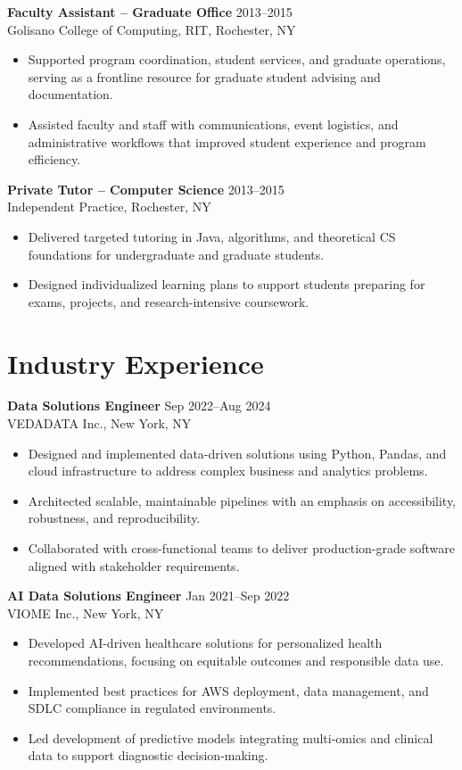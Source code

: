 \documentclass[11pt,letterpaper]{article}
\begin{document}
\textbf{Faculty Assistant – Graduate Office} \hfill 2013–2015\\
Golisano College of Computing, RIT, Rochester, NY
\begin{itemize}
    \item Supported program coordination, student services, and graduate operations, serving as a frontline resource for graduate student advising and documentation.
    \item Assisted faculty and staff with communications, event logistics, and administrative workflows that improved student experience and program efficiency.
\end{itemize}

\textbf{Private Tutor – Computer Science} \hfill 2013–2015\\
Independent Practice, Rochester, NY
\begin{itemize}
    \item Delivered targeted tutoring in Java, algorithms, and theoretical CS foundations for undergraduate and graduate students.
    \item Designed individualized learning plans to support students preparing for exams, projects, and research-intensive coursework.
\end{itemize}

\section{Industry Experience}

\textbf{Data Solutions Engineer} \hfill Sep 2022–Aug 2024\\
VEDADATA Inc., New York, NY
\begin{itemize}
    \item Designed and implemented data-driven solutions using Python, Pandas, and cloud infrastructure to address complex business and analytics problems.
    \item Architected scalable, maintainable pipelines with an emphasis on accessibility, robustness, and reproducibility.
    \item Collaborated with cross-functional teams to deliver production-grade software aligned with stakeholder requirements.
\end{itemize}

\textbf{AI Data Solutions Engineer} \hfill Jan 2021–Sep 2022\\
VIOME Inc., New York, NY
\begin{itemize}
    \item Developed AI-driven healthcare solutions for personalized health recommendations, focusing on equitable outcomes and responsible data use.
    \item Implemented best practices for AWS deployment, data management, and SDLC compliance in regulated environments.
    \item Led development of predictive models integrating multi-omics and clinical data to support diagnostic decision-making.
\end{itemize}
\end{document}
